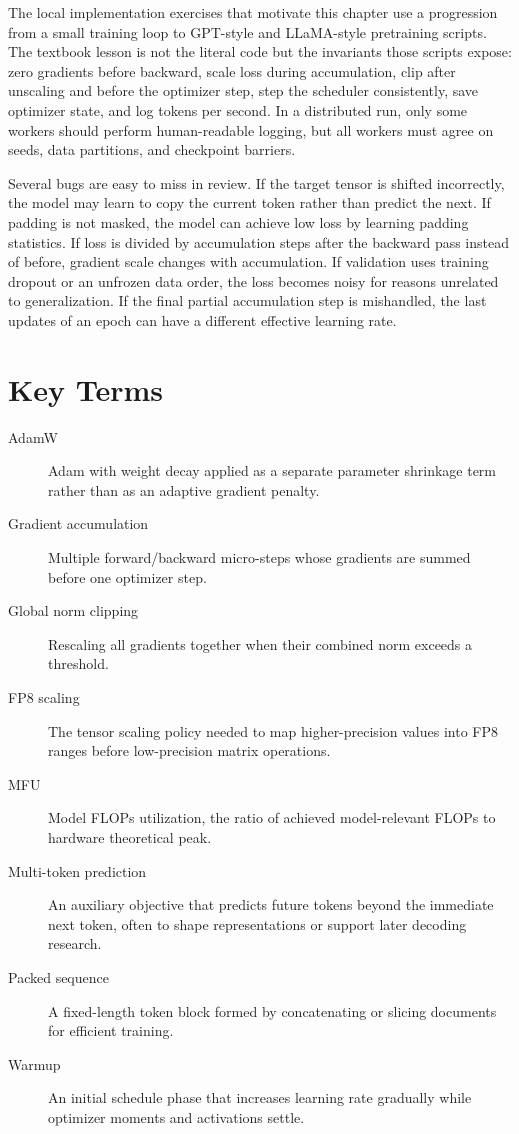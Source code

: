 The local implementation exercises that motivate this chapter use a progression from a small \transformer training loop to GPT-style and LLaMA-style pretraining scripts. The textbook lesson is not the literal code but the invariants those scripts expose: zero gradients before backward, scale loss during accumulation, clip after unscaling and before the optimizer step, step the scheduler consistently, save optimizer state, and log tokens per second. In a distributed run, only some workers should perform human-readable logging, but all workers must agree on seeds, data partitions, and checkpoint barriers.

Several bugs are easy to miss in review. If the target tensor is shifted incorrectly, the model may learn to copy the current token rather than predict the next. If padding is not masked, the model can achieve low loss by learning padding statistics. If loss is divided by accumulation steps after the backward pass instead of before, gradient scale changes with accumulation. If validation uses training dropout or an unfrozen data order, the loss becomes noisy for reasons unrelated to generalization. If the final partial accumulation step is mishandled, the last updates of an epoch can have a different effective learning rate.

\section{Key Terms}
\label{sec:optimization-key-terms}

\begin{description}
\item[AdamW] Adam with weight decay applied as a separate parameter shrinkage term rather than as an adaptive gradient penalty.
\item[Gradient accumulation] Multiple forward/backward micro-steps whose gradients are summed before one optimizer step.
\item[Global norm clipping] Rescaling all gradients together when their combined norm exceeds a threshold.
\item[FP8 scaling] The tensor scaling policy needed to map higher-precision values into FP8 ranges before low-precision matrix operations.
\item[MFU] Model FLOPs utilization, the ratio of achieved model-relevant FLOPs to hardware theoretical peak.
\item[Multi-token prediction] An auxiliary objective that predicts future tokens beyond the immediate next token, often to shape representations or support later decoding research.
\item[Packed sequence] A fixed-length token block formed by concatenating or slicing documents for efficient training.
\item[Warmup] An initial schedule phase that increases learning rate gradually while optimizer moments and activations settle.
\end{description}

